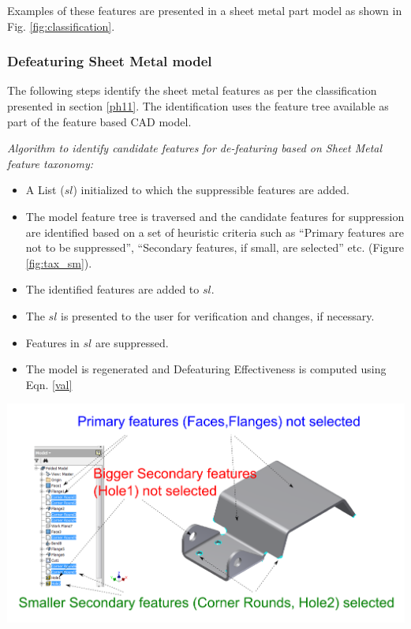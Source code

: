 Examples of these features are presented in a sheet metal part model as shown in Fig.  \ref{fig:classification}.

\subsubsection{Defeaturing Sheet Metal model}

The following steps identify the sheet metal features as per the classification presented in section \ref{ph11}.
The identification uses the feature tree available as part of the feature based CAD model.

\bigskip

{\em Algorithm to identify candidate features for de-featuring based on Sheet Metal feature taxonomy:}

\begin{minipage}[c]{0.55\linewidth}
\begin{itemize}
[noitemsep,topsep=2pt,parsep=2pt,partopsep=2pt,leftmargin=*]

\item A List  ({\bf $sl$}) initialized to which the suppressible features are added. 
\item The model feature tree is traversed and the candidate features for suppression are identified based on a set of heuristic criteria such as ``Primary features are not to be suppressed'', ``Secondary features, if small, are selected'' etc.  (Figure \ref{fig:tax_sm}).
\item The identified features are added to {\bf $sl$}.
\item The {\bf $sl$} is presented to the user for verification and changes, if necessary. 
\item Features in  {\bf $sl$} are suppressed.
\item The model is regenerated and Defeaturing Effectiveness is computed using Eqn. \ref{val}
\end{itemize}
 
\end{minipage}
\hfill
\begin{minipage}[c]{0.43\linewidth}
\centering \includegraphics[width=\linewidth]{..//Common/images/SheetMetal_Ph1_Selection_Annotated}
\label{fig:classification}
\end{minipage}

